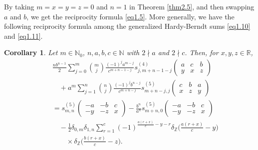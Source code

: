 \documentclass[reqno]{amsart}
\numberwithin{equation}{section}
\newtheorem{corollary}[thm]{Corollary}
\begin{document}
By taking $m=x=y=z=0$ and $n=1$ in Theorem \ref{thm2.5}, and then swapping $a$ and $b$, we get the reciprocity formula \eqref{eq1.5}.
More generally, we have the following reciprocity formula among the generalized Hardy-Berndt sums \eqref{eq1.10} and \eqref{eq1.11}.

\begin{corollary}\label{cor2.6} Let $m\in\mathbb{N}_{0}$, $n,a,b,c\in\mathbb{N}$ with $2\nmid a$ and $2\nmid c$. Then, for $x,y,z\in\mathbb{R}$,
\begin{eqnarray}\label{eq2.14}
&&\frac{nb^{n-1}}{2}\sum_{j=0}^{m}
\binom{m}{j}\frac{(-1)^{j}a^{m-j}}{c^{m+n-1-j}}s_{j,m+n-1-j}^{(4)}\left(
\begin{matrix}
a & c & b \\
y & x & z
\end{matrix}
\right)\nonumber\\
&&\quad+a^{m}\sum_{j=1}^{n}\binom{n}{j}\frac{(-1)^{j}b^{n-j}}{c^{m+n-j}}s_{m+n-j,j}^{(5)}\left(
\begin{matrix}
c & b & a \\
x & z & y
\end{matrix}
\right)\nonumber\\
&&=s_{m,n}^{(5)}\left(
\begin{matrix}
-a & -b & c \\
-y & -z & x
\end{matrix}
\right)-\frac{b^{n}}{a^{n}}s_{m+n,0}^{(5)}\left(
\begin{matrix}
-a & -b & c \\
-y & -z & x
\end{matrix}
\right)\nonumber\\
&&\quad-\frac{1}{2}\delta_{0,m}\delta_{1,n}\sum_{r=1}^{c}(-1)^{\frac{a(r+x)}{c}-y-r}\delta_{\mathbb{Z}}\biggl(\frac{a(r+x)}{c}-y\biggl)\nonumber\\
&&\qquad\times\delta_{\mathbb{Z}}\biggl(\frac{b(r+x)}{c}-z\biggl).
\end{eqnarray}
\end{corollary}
\end{document}
